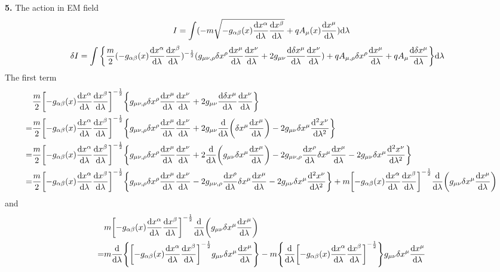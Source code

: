 \documentclass{article}
\begin{document}
{\bf5.}\quad
The action in EM field
$$I=\int(-m\sqrt{-g_{\alpha\beta}(x)\dv{x^{\alpha}}{\lambda}\dv{x^{\beta}}{\lambda}}+qA_{\mu}(x)\dv{x^{\mu}}{\lambda})\dd\lambda$$
\begin{align*}
  \delta I&=\int\Bqty{\frac{m}{2}(-g_{\alpha\beta}(x)\dv{x^{\alpha}}{\lambda}\dv{x^{\beta}}{\lambda})^{-\frac{1}{2}}(g_{\mu\nu,\rho}\delta x^{\rho}\dv{x^{\mu}}{\lambda}\dv{x^{\nu}}{\lambda}+2g_{\mu\nu}\dv{\delta x^{\mu}}{\lambda}\dv{x^{\nu}}{\lambda})+qA_{\mu,\rho}\delta x^{\rho}\dv{x^{\mu}}{\lambda}+qA_{\mu}\dv{\delta x^{\mu}}{\lambda}}\dd\lambda
\end{align*}
The first term
\begin{align*}
  &\frac{m}{2}\bqty{-g_{\alpha\beta}(x)\dv{x^{\alpha}}{\lambda}\dv{x^{\beta}}{\lambda}}^{-\frac{1}{2}}\Bqty{g_{\mu\nu,\rho}\delta x^{\rho}\dv{x^{\mu}}{\lambda}\dv{x^{\nu}}{\lambda}+2g_{\mu\nu}\dv{\delta x^{\mu}}{\lambda}\dv{x^{\nu}}{\lambda}}\\
  =&\frac{m}{2}\bqty{-g_{\alpha\beta}(x)\dv{x^{\alpha}}{\lambda}\dv{x^{\beta}}{\lambda}}^{-\frac{1}{2}}\Bqty{g_{\mu\nu,\rho}\delta x^{\rho}\dv{x^{\mu}}{\lambda}\dv{x^{\nu}}{\lambda}+2g_{\mu\nu}\dv{\lambda}(\delta{x^{\mu}}\dv{x^{\mu}}{\lambda})-2g_{\mu\nu}\delta x^{\mu}\dv[2]{x^{\nu}}{\lambda}}\\
  =&\frac{m}{2}\bqty{-g_{\alpha\beta}(x)\dv{x^{\alpha}}{\lambda}\dv{x^{\beta}}{\lambda}}^{-\frac{1}{2}}\Bqty{g_{\mu\nu,\rho}\delta x^{\rho}\dv{x^{\mu}}{\lambda}\dv{x^{\nu}}{\lambda}+2\dv{\lambda}(g_{\mu\nu}\delta{x^{\mu}}\dv{x^{\mu}}{\lambda})-2g_{\mu\nu,\rho}\dv{x^{\rho}}{\lambda}\delta{x^{\mu}}\dv{x^{\mu}}{\lambda}-2g_{\mu\nu}\delta x^{\mu}\dv[2]{x^{\nu}}{\lambda}}\\
  =&\frac{m}{2}\bqty{-g_{\alpha\beta}(x)\dv{x^{\alpha}}{\lambda}\dv{x^{\beta}}{\lambda}}^{-\frac{1}{2}}\Bqty{g_{\mu\nu,\rho}\delta x^{\rho}\dv{x^{\mu}}{\lambda}\dv{x^{\nu}}{\lambda}-2g_{\mu\nu,\rho}\dv{x^{\rho}}{\lambda}\delta{x^{\mu}}\dv{x^{\mu}}{\lambda}-2g_{\mu\nu}\delta x^{\mu}\dv[2]{x^{\nu}}{\lambda}}+m\bqty{-g_{\alpha\beta}(x)\dv{x^{\alpha}}{\lambda}\dv{x^{\beta}}{\lambda}}^{-\frac{1}{2}}\dv{\lambda}(g_{\mu\nu}\delta{x^{\mu}}\dv{x^{\mu}}{\lambda})
\end{align*}
and
\begin{align*}
  &m\bqty{-g_{\alpha\beta}(x)\dv{x^{\alpha}}{\lambda}\dv{x^{\beta}}{\lambda}}^{-\frac{1}{2}}\dv{\lambda}(g_{\mu\nu}\delta{x^{\mu}}\dv{x^{\mu}}{\lambda})\\
  =&m\dv{\lambda}\Bqty{\bqty{-g_{\alpha\beta}(x)\dv{x^{\alpha}}{\lambda}\dv{x^{\beta}}{\lambda}}^{-\frac{1}{2}}g_{\mu\nu}\delta{x^{\mu}}\dv{x^{\mu}}{\lambda}}-m\Bqty{\dv{\lambda}\bqty{-g_{\alpha\beta}(x)\dv{x^{\alpha}}{\lambda}\dv{x^{\beta}}{\lambda}}^{-\frac{1}{2}}}g_{\mu\nu}\delta{x^{\mu}}\dv{x^{\mu}}{\lambda}
\end{align*}
\end{document}
